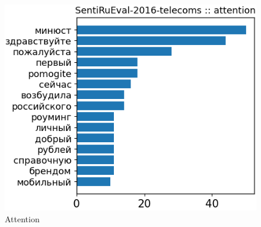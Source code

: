 \begin{itemize}
\begin{figure}[H]
\begin{minipage}[b]{0.49\textwidth}
\includegraphics[width=\textwidth]{pictures/examples_telecoms/dct2.png} %
\caption{Attention}
\end{minipage}
\end{figure}


\end{itemize}
